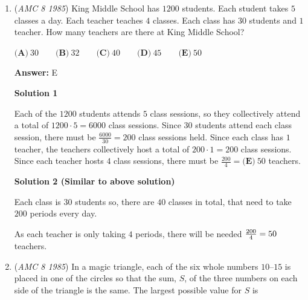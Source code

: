 \begin{enumerate}
 Therefore, $\frac{100000}{8000000} = \boxed{\textbf{(B)}\ \frac{1}{80}}$ of valid phone numbers start with $9$ and end with $0$.

 



\textbf{Solution 2}

Notice that selecting a random valid phone number is identical to randomly and independently selecting each digit of the phone number.

 There are $10-2=8$ possibilities for the first digit and $10$ possibilities for the last digit, so the probability of selecting a phone number with first digit $9$ and last digit $0$ is $\frac{1}{8} \cdot \frac{1}{10} = \boxed{\textbf{(B)}\ \frac{1}{80}}$.

 


	\item (\textit{AMC 8 1985}) King Middle School has $1200$ students.  Each student takes $5$ classes a day.  Each teacher teaches $4$ classes.  Each class has $30$ students and $1$ teacher.  How many teachers are there at King Middle School?  


 $\textbf{(A)}\ 30 \qquad \textbf{(B)}\ 32 \qquad \textbf{(C)}\ 40 \qquad \textbf{(D)}\ 45 \qquad \textbf{(E)}\ 50$

 \textbf{Answer: }E



\textbf{Solution 1}

Each of the $1200$ students attends $5$ class sessions, so they collectively attend a total of $1200 \cdot 5 = 6000$ class sessions.  Since $30$ students attend each class session, there must be $\frac{6000}{30}=200$ class sessions held.  Since each class has $1$ teacher, the teachers collectively host a total of $200 \cdot 1 = 200$ class sessions.  Since each teacher hosts $4$ class sessions, there must be $\frac{200}{4} = \boxed{\textbf{(E)}\ 50}$ teachers.

 



\textbf{Solution 2 (Similar to above solution)}

Each class is $30$ students so, there are $40$ classes in total, that need to take $200$ periods every day.

 As each teacher is only taking $4$ periods, there will be needed ${200 \over 4} = 50$ teachers.

 


	\item (\textit{AMC 8 1985}) In a magic triangle, each of the six whole numbers $10\text{--}15$ is placed in one of the circles so that the sum, $S$, of the three numbers on each side of the triangle is the same.  The largest possible value for $S$ is



\end{enumerate}
